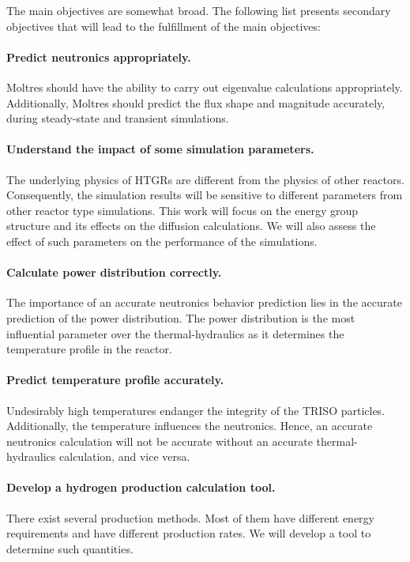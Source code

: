 \vskip 0.6cm
The main objectives are somewhat broad.
The following list presents secondary objectives that will lead to the fulfillment of the main objectives:

\paragraph{Predict neutronics appropriately.}
Moltres should have the ability to carry out eigenvalue calculations appropriately.
Additionally, Moltres should predict the flux shape and magnitude accurately, during steady-state and transient simulations.

\paragraph{Understand the impact of some simulation parameters.}
The underlying physics of \glspl{HTGR} are different from the physics of other reactors.
Consequently, the simulation results will be sensitive to different parameters from other reactor type simulations.
This work will focus on the energy group structure and its effects on the diffusion calculations.
We will also assess the effect of such parameters on the performance of the simulations.

\paragraph{Calculate power distribution correctly.}
The importance of an accurate neutronics behavior prediction lies in the accurate prediction of the power distribution.
The power distribution is the most influential parameter over the thermal-hydraulics as it determines the temperature profile in the reactor.

\paragraph{Predict temperature profile accurately.}
Undesirably high temperatures endanger the integrity of the TRISO particles.
Additionally, the temperature influences the neutronics.
Hence, an accurate neutronics calculation will not be accurate without an accurate thermal-hydraulics calculation, and vice versa.

\paragraph{Develop a hydrogen production calculation tool.}
There exist several production methods.
Most of them have different energy requirements and have different production rates.
We will develop a tool to determine such quantities.